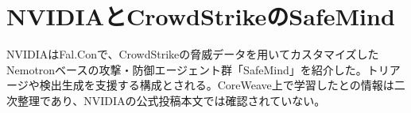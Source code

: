 \section{NVIDIAとCrowdStrikeのSafeMind}
NVIDIAはFal.Conで、CrowdStrikeの脅威データを用いてカスタマイズしたNemotronベースの攻撃・防御エージェント群「SafeMind」を紹介した。トリアージや検出生成を支援する構成とされる。CoreWeave上で学習したとの情報は二次整理であり、NVIDIAの公式投稿本文では確認されていない。
